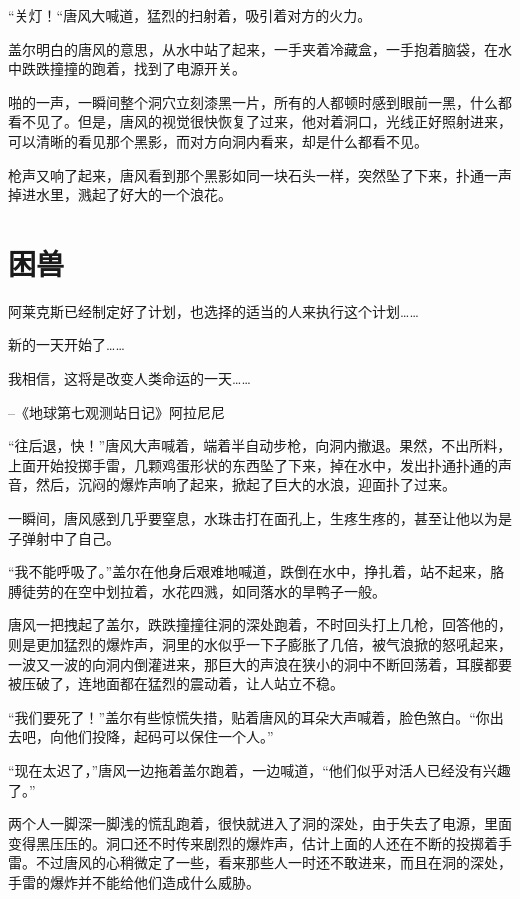 “关灯！“唐风大喊道，猛烈的扫射着，吸引着对方的火力。

盖尔明白的唐风的意思，从水中站了起来，一手夹着冷藏盒，一手抱着脑袋，在水中跌跌撞撞的跑着，找到了电源开关。

啪的一声，一瞬间整个洞穴立刻漆黑一片，所有的人都顿时感到眼前一黑，什么都看不见了。但是，唐风的视觉很快恢复了过来，他对着洞口，光线正好照射进来，可以清晰的看见那个黑影，而对方向洞内看来，却是什么都看不见。

枪声又响了起来，唐风看到那个黑影如同一块石头一样，突然坠了下来，扑通一声掉进水里，溅起了好大的一个浪花。

\chapter{困兽}

\begin{myquote}
 阿莱克斯已经制定好了计划，也选择的适当的人来执行这个计划……

新的一天开始了……

我相信，这将是改变人类命运的一天……   
\end{myquote}

\begin{myflushright}
--《地球第七观测站日记》阿拉尼尼
\end{myflushright}

“往后退，快！”唐风大声喊着，端着半自动步枪，向洞内撤退。果然，不出所料，上面开始投掷手雷，几颗鸡蛋形状的东西坠了下来，掉在水中，发出扑通扑通的声音，然后，沉闷的爆炸声响了起来，掀起了巨大的水浪，迎面扑了过来。

一瞬间，唐风感到几乎要窒息，水珠击打在面孔上，生疼生疼的，甚至让他以为是子弹射中了自己。

“我不能呼吸了。”盖尔在他身后艰难地喊道，跌倒在水中，挣扎着，站不起来，胳膊徒劳的在空中划拉着，水花四溅，如同落水的旱鸭子一般。

唐风一把拽起了盖尔，跌跌撞撞往洞的深处跑着，不时回头打上几枪，回答他的，则是更加猛烈的爆炸声，洞里的水似乎一下子膨胀了几倍，被气浪掀的怒吼起来，一波又一波的向洞内倒灌进来，那巨大的声浪在狭小的洞中不断回荡着，耳膜都要被压破了，连地面都在猛烈的震动着，让人站立不稳。

“我们要死了！”盖尔有些惊慌失措，贴着唐风的耳朵大声喊着，脸色煞白。“你出去吧，向他们投降，起码可以保住一个人。”

“现在太迟了，”唐风一边拖着盖尔跑着，一边喊道，“他们似乎对活人已经没有兴趣了。”

两个人一脚深一脚浅的慌乱跑着，很快就进入了洞的深处，由于失去了电源，里面变得黑压压的。洞口还不时传来剧烈的爆炸声，估计上面的人还在不断的投掷着手雷。不过唐风的心稍微定了一些，看来那些人一时还不敢进来，而且在洞的深处，手雷的爆炸并不能给他们造成什么威胁。

